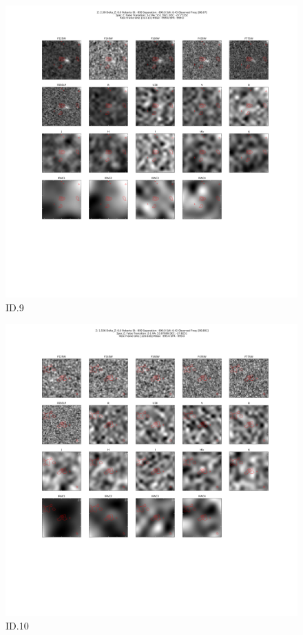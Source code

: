 \begin{figure}[tbp]
\centering \includegraphics[width=120mm]{Matched/ASPECS_Cutout_9.png}
\caption{ID.9}
\label{fig:Match_Three}
\end{figure}

\begin{figure}[tbp]
\centering \includegraphics[width=120mm]{Matched/ASPECS_Cutout_10.png}
\caption{ID.10}
\label{fig:Match_Three}
\end{figure}


